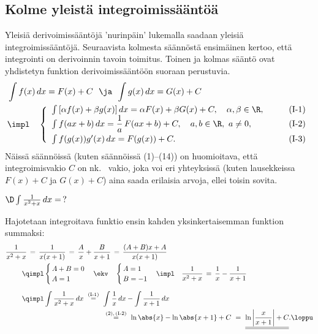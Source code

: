 \subsection*{Kolme yleistä integroimissääntöä}

Yleisiä derivoimissääntöjä 'nurinpäin' lukemalla saadaan yleisiä integroimissääntöjä. 
Seuraavista kolmesta säännöstä ensimäinen kertoo, että integrointi on derivoinnin tavoin 
 toimitus. Toinen ja kolmas sääntö ovat yhdistetyn funktion
derivoimissääntöön suoraan perustuvia.
\begin{align*}
&\int f(x)\, dx=F(x)+C\ \ \ja\,\ \int g(x)\, dx=G(x)+C \\
&\impl \quad \left\{ \begin{array}{lr}
     \int\, [\alpha f(x)+\beta g(x)]\, dx
                =\alpha F(x) +\beta G(x) +C,\quad \alpha,\beta\in\R, &\qquad \text{(I-1)} \\
     \int f(ax+b)\, dx 
                =\dfrac{1}{a}\,F(ax+b)+C,\quad a,b\in\R, \ a\neq 0, &\qquad \text{(I-2)} \\[2mm]
     \int f(g(x))g'(x)\, dx = F(g(x))+C.     &\qquad \text{(I-3)}
                     \end{array} \right.
\end{align*}
Näissä säännöissä (kuten säännöissä (1)--(14)) on huomioitava, että integroimisvakio $C$ on nk.\
%
 vakio, joka voi eri yhteyksissä (kuten lausekkeissa $F(x)+C$ ja $G(x)+C$) aina
saada erilaisia arvoja, ellei toisin sovita.
\begin{Exa} \label{E10.1.2}
$\D\int\frac{1}{x^2+x}\, dx=\,?$
\end{Exa}
\ratk Hajotetaan integroitava funktio ensin kahden yksinkertaisemman funktion summaksi:
\begin{align*}
&\frac{1}{x^2+x} \,=\, \frac{1}{x(x+1)} \,=\, \frac{A}{x}+\frac{B}{x+1}
                                         \,=\, \frac{(A+B)x+A}{x(x+1)} \\ 
&\qquad\ \qimpl \begin{cases} \,A+B=0 \\ \,A=1 \end{cases}
         \ekv\quad \begin{cases} \,A=1 \\ \,B=-1  \end{cases} 
         \impl\quad \frac{1}{x^2+x} \,=\, \frac{1}{x}-\frac{1}{x+1} \\[2mm]
&\qquad\ \qimpl \int \frac{1}{x^2+x}\,dx\ 
                \overset{\text{(I-1)}}{=}\ \int \frac{1}{x}\, dx - \int\frac{1}{x+1}\, dx \\
&\hspace{48mm}\ \overset{(2),\,\text{(I-2)}}{=}\ \ln\abs{x}-\ln\abs{x+1}+C\
                    =\ \underline{\underline{\ln\left|\frac{x}{x+1}\right|+C}}. \loppu
\end{align*}
